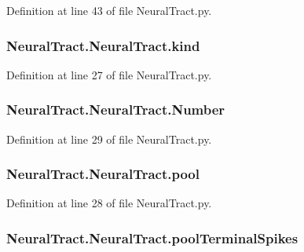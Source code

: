 Definition at line 43 of file Neural\-Tract.\-py.

\hypertarget{class_neural_tract_1_1_neural_tract_af52b112c86e0c774fa204b7e2154b6aa}{
\subsubsection[{kind}]{\setlength{\rightskip}{0pt plus 5cm}Neural\-Tract.\-Neural\-Tract.\-kind}}\label{class_neural_tract_1_1_neural_tract_af52b112c86e0c774fa204b7e2154b6aa}


Definition at line 27 of file Neural\-Tract.\-py.

\hypertarget{class_neural_tract_1_1_neural_tract_a9cf4c6df3fb8818e955817bb3ea9ffc4}{
\subsubsection[{Number}]{\setlength{\rightskip}{0pt plus 5cm}Neural\-Tract.\-Neural\-Tract.\-Number}}\label{class_neural_tract_1_1_neural_tract_a9cf4c6df3fb8818e955817bb3ea9ffc4}


Definition at line 29 of file Neural\-Tract.\-py.

\hypertarget{class_neural_tract_1_1_neural_tract_af0d232b9b86f3bae802b32777d0405d0}{
\subsubsection[{pool}]{\setlength{\rightskip}{0pt plus 5cm}Neural\-Tract.\-Neural\-Tract.\-pool}}\label{class_neural_tract_1_1_neural_tract_af0d232b9b86f3bae802b32777d0405d0}


Definition at line 28 of file Neural\-Tract.\-py.

\hypertarget{class_neural_tract_1_1_neural_tract_a1d104906ff30028e44e377a9e1ed5a3d}{
\subsubsection[{pool\-Terminal\-Spikes}]{\setlength{\rightskip}{0pt plus 5cm}Neural\-Tract.\-Neural\-Tract.\-pool\-Terminal\-Spikes}}\label{class_neural_tract_1_1_neural_tract_a1d104906ff30028e44e377a9e1ed5a3d}


